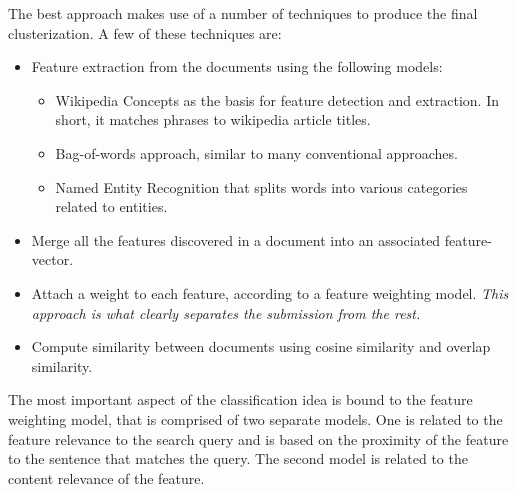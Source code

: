 The best approach makes use of a number of techniques to produce the final
clusterization. A few of these techniques are:
\begin {itemize}
    \item
        Feature extraction from the documents using the following models:
    \begin {itemize}
        \item {Wikipedia Concepts as the basis for feature detection and extraction.
               In short, it matches phrases to wikipedia article titles.}
        \item {Bag-of-words approach, similar to many conventional approaches.}
        \item {Named Entity Recognition that splits words into various categories
               related to entities.}
   \end{itemize}
   \item
       Merge all the features discovered in a document into an associated feature-vector.
   \item
       Attach a weight to each feature, according to a feature weighting model.
       {\em This approach is what clearly separates the submission from the rest.\/}

   \item
       Compute similarity between documents using cosine similarity and overlap similarity.
\end{itemize}
The most important aspect of the classification idea is bound to the feature
weighting model, that is comprised of two separate models. One is related to the
feature relevance to the search query and is based on the proximity of the feature
to the sentence that matches the query. The second model is related to the content
relevance of the feature. 

